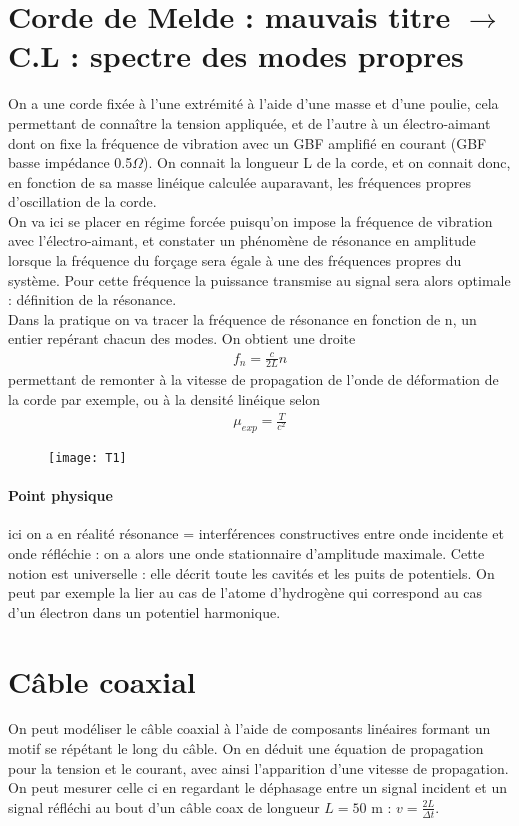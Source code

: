 \documentclass[12pt,prb,aps,epsf]{article}
\begin{document}
\section{Corde de Melde : mauvais titre $\rightarrow$ C.L : spectre des modes propres}
On a une corde fixée à l'une extrémité à l'aide d'une masse et d'une poulie, cela permettant de connaître la tension appliquée, et de l'autre à un électro-aimant dont on fixe la fréquence de vibration avec un GBF amplifié en courant (GBF basse impédance 0.5$\Omega$). On connait la longueur L de la corde, et on connait donc, en fonction de sa masse linéique calculée auparavant, les fréquences propres d'oscillation de la corde.\\
On va ici se placer en régime forcée puisqu'on impose la fréquence de vibration avec l'électro-aimant, et constater un phénomène de résonance en amplitude lorsque la fréquence du forçage sera égale à une des fréquences propres du système. Pour cette fréquence la puissance transmise au signal sera alors optimale : définition de la résonance.\\

Dans la pratique on va tracer la fréquence de résonance en fonction de n, un entier repérant chacun des modes. On obtient une droite 
\begin{eqnarray}
f_n = \frac{c}{2L}n
\end{eqnarray} 
permettant de remonter à la vitesse de propagation de l'onde de déformation de la corde par exemple, ou à la densité linéique selon
\begin{eqnarray}
\mu_{exp} = \frac{T}{c^2}
\end{eqnarray}

\begin{figure}
	\centerline{\texttt{[image: T1]}}
\end{figure}

\paragraph{Point physique} ici on a en réalité résonance = interférences constructives entre onde incidente et onde réfléchie : on a alors une onde stationnaire d'amplitude maximale. Cette notion est universelle : elle décrit toute les cavités et les puits de potentiels. On peut par exemple la lier au cas de l'atome d'hydrogène qui correspond au cas d'un électron dans un potentiel harmonique.

\section{Câble coaxial}
On peut modéliser le câble coaxial à l'aide de composants linéaires formant un motif se répétant le long du câble. On en déduit une équation de propagation pour la tension et le courant, avec ainsi l'apparition d'une vitesse de propagation. On peut mesurer celle ci en regardant le déphasage entre un signal incident et un signal réfléchi au bout d'un câble coax de longueur  $L=50$ m : $v = \frac{2L}{\Delta t}$.\\
\end{document}
